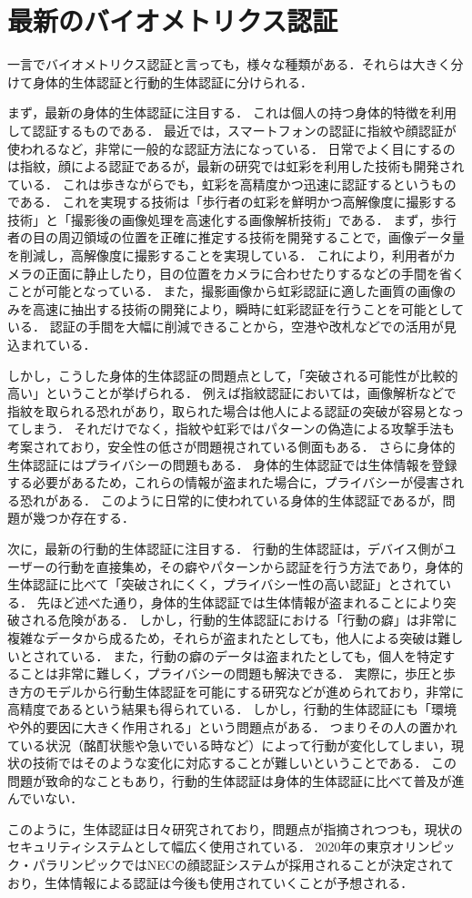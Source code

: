 \section{最新のバイオメトリクス認証}
一言でバイオメトリクス認証と言っても，様々な種類がある．それらは大きく分けて身体的生体認証と行動的生体認証に分けられる．

まず，最新の身体的生体認証に注目する．
これは個人の持つ身体的特徴を利用して認証するものである．
最近では，スマートフォンの認証に指紋や顔認証が使われるなど，非常に一般的な認証方法になっている．
日常でよく目にするのは指紋，顔による認証であるが，最新の研究では虹彩を利用した技術も開発されている．
これは歩きながらでも，虹彩を高精度かつ迅速に認証するというものである．
これを実現する技術は「歩行者の虹彩を鮮明かつ高解像度に撮影する技術」と「撮影後の画像処理を高速化する画像解析技術」である．
まず，歩行者の目の周辺領域の位置を正確に推定する技術を開発することで，画像データ量を削減し，高解像度に撮影することを実現している．
これにより，利用者がカメラの正面に静止したり，目の位置をカメラに合わせたりするなどの手間を省くことが可能となっている．
また，撮影画像から虹彩認証に適した画質の画像のみを高速に抽出する技術の開発により，瞬時に虹彩認証を行うことを可能としている．
認証の手間を大幅に削減できることから，空港や改札などでの活用が見込まれている．

しかし，こうした身体的生体認証の問題点として，「突破される可能性が比較的高い」ということが挙げられる．
例えば指紋認証においては，画像解析などで指紋を取られる恐れがあり，取られた場合は他人による認証の突破が容易となってしまう．
それだけでなく，指紋や虹彩ではパターンの偽造による攻撃手法も考案されており，安全性の低さが問題視されている側面もある．
さらに身体的生体認証にはプライバシーの問題もある．
身体的生体認証では生体情報を登録する必要があるため，これらの情報が盗まれた場合に，プライバシーが侵害される恐れがある．
このように日常的に使われている身体的生体認証であるが，問題が幾つか存在する．

次に，最新の行動的生体認証に注目する．
行動的生体認証は，デバイス側がユーザーの行動を直接集め，その癖やパターンから認証を行う方法であり，身体的生体認証に比べて「突破されにくく，プライバシー性の高い認証」とされている．
先ほど述べた通り，身体的生体認証では生体情報が盗まれることにより突破される危険がある．
しかし，行動的生体認証における「行動の癖」は非常に複雑なデータから成るため，それらが盗まれたとしても，他人による突破は難しいとされている．
また，行動の癖のデータは盗まれたとしても，個人を特定することは非常に難しく，プライバシーの問題も解決できる．
実際に，歩圧と歩き方のモデルから行動生体認証を可能にする研究などが進められており，非常に高精度であるという結果も得られている．
しかし，行動的生体認証にも「環境や外的要因に大きく作用される」という問題点がある．
つまりその人の置かれている状況（酩酊状態や急いでいる時など）によって行動が変化してしまい，現状の技術ではそのような変化に対応することが難しいということである．
この問題が致命的なこともあり，行動的生体認証は身体的生体認証に比べて普及が進んでいない．

このように，生体認証は日々研究されており，問題点が指摘されつつも，現状のセキュリティシステムとして幅広く使用されている．
2020年の東京オリンピック・パラリンピックではNECの顔認証システムが採用されることが決定されており，生体情報による認証は今後も使用されていくことが予想される．